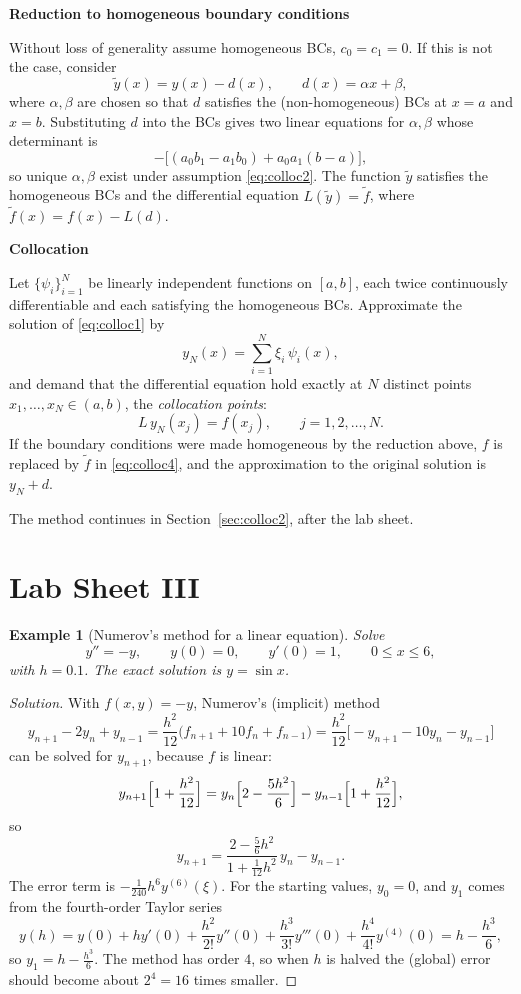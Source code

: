 \documentclass[11pt,a4paper]{article}
\numberwithin{equation}{section}
\theoremstyle{spacedplain}
\theoremstyle{spaceddefinition}
\newtheorem{example}[theorem]{Example}
\theoremstyle{spacedremark}
\newcommand{\step}[1]{\par\addvspace{0.6em}\noindent\textbf{#1}\par\nobreak}
\begin{document}
\step{Reduction to homogeneous boundary conditions}
Without loss of
generality assume homogeneous BCs, \(c_0=c_1=0\).  If this is not the
case, consider
\[
  \tilde y(x)=y(x)-d(x),\qquad d(x)=\alpha x+\beta,
\]
where \(\alpha,\beta\) are chosen so that \(d\) satisfies the
(non-homogeneous) BCs at \(x=a\) and \(x=b\).  Substituting \(d\) into
the BCs gives two linear equations for \(\alpha,\beta\) whose
determinant is
\[
  -\bigl[(a_0b_1-a_1b_0)+a_0a_1(b-a)\bigr],
\]
so unique \(\alpha,\beta\) exist under assumption \eqref{eq:colloc2}.
The function \(\tilde y\) satisfies the homogeneous BCs and the
differential equation \(L(\tilde y)=\tilde f\), where
\(\tilde f(x)=f(x)-L(d)\).

\step{Collocation}
Let \(\{\psi_i\}_{i=1}^N\) be linearly
independent functions on \([a,b]\), each twice continuously
differentiable and each satisfying the homogeneous BCs.  Approximate
the solution of \eqref{eq:colloc1} by
\begin{equation}\label{eq:colloc3}
  y_N(x)=\sum_{i=1}^N\xi_i\,\psi_i(x),
\end{equation}
and demand that the differential equation hold exactly at \(N\)
distinct points \(x_1,\dots,x_N\in(a,b)\), the \emph{collocation
points}:
\begin{equation}\label{eq:colloc4}
  L\,y_N(x_j)=f(x_j),\qquad j=1,2,\dots,N.
\end{equation}
If the boundary conditions were made homogeneous by the reduction
above, \(f\) is replaced by \(\tilde f\) in \eqref{eq:colloc4}, and the
approximation to the original solution is \(y_N+d\).

The method continues in Section~\ref{sec:colloc2}, after the lab sheet.

\section{Lab Sheet III}

\begin{example}[Numerov's method for a linear equation]
Solve
\[
  y''=-y,\qquad y(0)=0,\qquad y'(0)=1,\qquad 0\le x\le6,
\]
with \(h=0.1\).  The exact solution is \(y=\sin x\).
\end{example}

\begin{proof}[Solution]
With \(f(x,y)=-y\), Numerov's (implicit) method
\[
  y_{n+1}-2y_n+y_{n-1}
  =\frac{h^2}{12}\bigl(f_{n+1}+10f_n+f_{n-1}\bigr)
  =\frac{h^2}{12}\bigl[-y_{n+1}-10y_n-y_{n-1}\bigr]
\]
can be solved for \(y_{n+1}\), because \(f\) is linear:
\[
  y_{n+1}\Bigl[1+\frac{h^2}{12}\Bigr]
  =y_n\Bigl[2-\frac{5h^2}6\Bigr]-y_{n-1}\Bigl[1+\frac{h^2}{12}\Bigr],
\]
so
\[
  \boxed{y_{n+1}=\frac{2-\frac56h^2}{1+\frac{1}{12}h^2}\,y_n-y_{n-1}}.
\]
The error term is \(-\frac1{240}h^6y^{(6)}(\xi)\).  For the starting
values, \(y_0=0\), and \(y_1\) comes from the fourth-order Taylor
series
\[
  y(h)=y(0)+hy'(0)+\frac{h^2}{2!}y''(0)+\frac{h^3}{3!}y'''(0)
       +\frac{h^4}{4!}y^{(4)}(0)
  =h-\frac{h^3}6,
\]
so \(y_1=h-\frac{h^3}6\).  The method has order \(4\), so when \(h\) is
halved the (global) error should become about \(2^4=16\) times smaller.
\end{proof}
\end{document}
